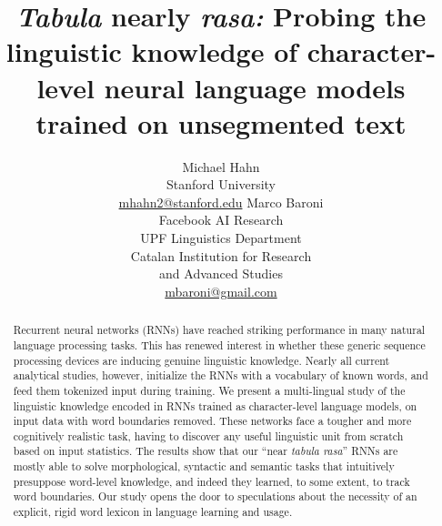 

\title{\emph{Tabula} nearly \emph{rasa:} Probing the linguistic knowledge of character-level neural language models trained on unsegmented text}


%


\author{Michael Hahn \\ Stanford University \\ \url{mhahn2@stanford.edu} \And Marco Baroni \\ Facebook AI Research \\ UPF Linguistics Department \\ Catalan Institution for Research\\and Advanced Studies \\ \url{mbaroni@gmail.com}}


\date{}

\hypersetup{draft}


\maketitle
\begin{abstract}
  Recurrent neural networks (RNNs) have reached striking performance in
  many natural language processing tasks. This has renewed interest in
  whether these generic sequence processing devices are inducing
  genuine linguistic knowledge. Nearly all current analytical studies,
  however, initialize the RNNs with a vocabulary of known words, and
  feed them tokenized input during training. We present a
  multi-lingual study of the linguistic knowledge encoded in RNNs
  trained as character-level language models, on input data with word
  boundaries removed. These networks face a tougher and more
  cognitively realistic task, having to discover any useful
  linguistic unit from scratch based on input statistics. The results
  show that our ``near \emph{tabula rasa}'' RNNs are mostly able to
  solve morphological, syntactic and semantic tasks that intuitively
  presuppose word-level knowledge, and indeed they learned, to some extent, to track
   word boundaries. Our study opens the door to speculations
  about the necessity of an explicit, rigid word lexicon in language learning and
  usage.
\end{abstract}


